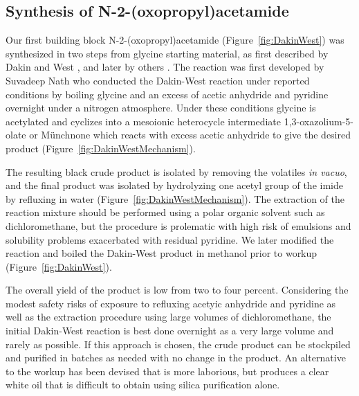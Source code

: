 
\clearpage

\subsection{Synthesis of N-2-(oxopropyl)acetamide}

Our first building block N-2-(oxopropyl)acetamide (Figure~\ref{fig:DakinWest}) was synthesized in two steps from glycine starting material, as first described by Dakin and West \cite{DakinWest_Rxn}, and later by others \cite{Aminoacetone_Hepworth}. The reaction was first developed by Suvadeep Nath who conducted the Dakin-West reaction under reported conditions by boiling glycine and an excess of acetic anhydride and pyridine overnight under a nitrogen atmosphere. Under these conditions glycine is acetylated and cyclizes into a mesoionic heterocycle intermediate 1,3-oxazolium-5-olate or M{\"u}nchnone which reacts with excess acetic anhydride to give the desired product (Figure~\ref{fig:DakinWestMechanism}).


The resulting black crude product is isolated by removing the volatiles {\it in vacuo}, and the final product was isolated by hydrolyzing one acetyl group of the imide by refluxing in water (Figure~\ref{fig:DakinWestMechanism}). The extraction of the reaction mixture should be performed using a polar organic solvent such as dichloromethane, but the procedure is prolematic with high risk of emulsions and solubility problems exacerbated with residual pyridine. We later modified the reaction and boiled the Dakin-West product in methanol prior to workup (Figure~\ref{fig:DakinWest}).

The overall yield of the product is low from two to four percent. Considering the modest safety risks of exposure to refluxing acetyic anhydride and pyridine as well as the extraction procedure using large volumes of dichloromethane, the initial Dakin-West reaction is best done overnight as a very large volume and rarely as possible. If this approach is chosen, the crude product can be stockpiled and purified in batches as needed with no change in the product. An alternative to the workup has been devised that is more laborious, but produces a clear white oil that is difficult to obtain using silica purification alone.

